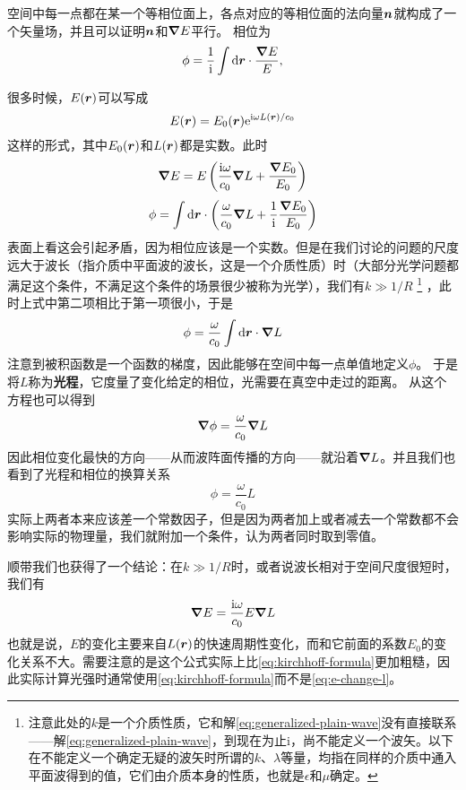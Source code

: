 \documentclass[UTF8, a4paper]{ctexart}
\newcommand*{\ii}{\mathrm{i}}
\newcommand*{\ee}{\mathrm{e}}
\begin{document}
空间中每一点都在某一个等相位面上，各点对应的等相位面的法向量$\vb*{n}$就构成了一个矢量场，并且可以证明$\vb*{n}$和$\grad{E}$平行。
相位为
\[
    \phi = \frac{1}{\ii} \int \dd{\vb*{r}} \cdot \frac{\grad{E}}{E},
\]

很多时候，$E(\vb*{r})$可以写成
\begin{equation}
    E(\vb*{r}) = E_0(\vb*{r})\ee^{\ii \omega L(\vb*{r}) / c_0}
    \label{eq:generalized-plain-wave}
\end{equation}
这样的形式，其中$E_0(\vb*{r})$和$L(\vb*{r})$都是实数。此时
\[
    \grad{E} = E \left(\frac{\ii \omega}{c_0} \grad{L} + \frac{\grad{E_0}}{E_0}\right)
\]
\[
    \phi = \int \dd{\vb*{r}} \cdot \left( \frac{\omega}{c_0} \grad{L} + \frac{1}{\ii} \frac{\grad{E_0}}{E_0} \right) 
\]
表面上看这会引起矛盾，因为相位应该是一个实数。但是在我们讨论的问题的尺度远大于波长（指介质中平面波的波长，这是一个介质性质）时（大部分光学问题都满足这个条件，不满足这个条件的场景很少被称为光学），我们有$k \gg 1/R$%
\footnote{注意此处的$k$是一个介质性质，它和解\eqref{eq:generalized-plain-wave}没有直接联系——解\eqref{eq:generalized-plain-wave}，到现在为止i，尚不能定义一个波矢。以下在不能定义一个确定无疑的波矢时所谓的$k$、$\lambda$等量，均指在同样的介质中通入平面波得到的值，它们由介质本身的性质，也就是$\epsilon$和$\mu$确定。}
，此时上式中第二项相比于第一项很小，于是
\begin{equation}
    \phi = \frac{\omega}{c_0} \int \dd{\vb*{r}} \cdot \grad{L}
    \label{eq:phrase-change}
\end{equation}
注意到被积函数是一个函数的梯度，因此能够在空间中每一点单值地定义$\phi$。
于是将$L$称为\textbf{光程}，它度量了变化给定的相位，光需要在真空中走过的距离。
从这个方程也可以得到
\[
    \grad{\phi} = \frac{\omega}{c_0} \grad{L}
\]
因此相位变化最快的方向——从而波阵面传播的方向——就沿着$\grad{L}$。并且我们也看到了光程和相位的换算关系
\begin{equation}
    \phi = \frac{\omega}{c_0} L
\end{equation}
实际上两者本来应该差一个常数因子，但是因为两者加上或者减去一个常数都不会影响实际的物理量，我们就附加一个条件，认为两者同时取到零值。

顺带我们也获得了一个结论：在$k \gg 1/R$时，或者说波长相对于空间尺度很短时，我们有
\begin{equation}
    \grad{E} = \frac{\ii \omega}{c_0} E \grad{L}
    \label{eq:e-change-l}
\end{equation}
也就是说，$E$的变化主要来自$L(\vb*{r})$的快速周期性变化，而和它前面的系数$E_0$的变化关系不大。需要注意的是这个公式实际上比\eqref{eq:kirchhoff-formula}更加粗糙，因此实际计算光强时通常使用\eqref{eq:kirchhoff-formula}而不是\eqref{eq:e-change-l}。
\end{document}
